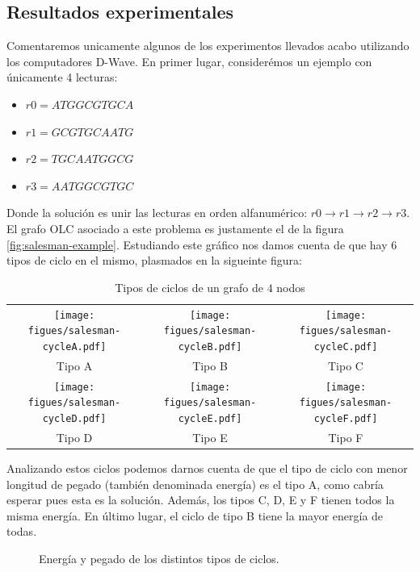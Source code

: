 \documentclass[11pt]{article}
\begin{document}
\subsection{Resultados experimentales}

Comentaremos unicamente algunos de los experimentos llevados acabo utilizando los computadores D-Wave. En primer lugar, considerémos un ejemplo con únicamente 4 lecturas:

\begin{itemize}
	\item $r0 = ATGGCGTGCA$
	\item $r1 = GCGTGCAATG$
	\item $r2 = TGCAATGGCG$
	\item $r3 = AATGGCGTGC$
\end{itemize}

Donde la solución es unir las lecturas en orden alfanumérico: $r0 \rightarrow r1 \rightarrow r2 \rightarrow r3$. El grafo OLC asociado a este problema es justamente el de la figura \ref{fig:salesman-example}. Estudiando este gráfico nos damos cuenta de que hay 6 tipos de ciclo en el mismo, plasmados en la sigueinte figura:

\begin{table}[H]
	\centering
	\begin{tabular}{ccc}		
		\texttt{[image: figues/salesman-cycleA.pdf]} &
		\texttt{[image: figues/salesman-cycleB.pdf]} &
		\texttt{[image: figues/salesman-cycleC.pdf]} \\
		
		Tipo A & Tipo B & Tipo C \\
		
		\texttt{[image: figues/salesman-cycleD.pdf]} &
		\texttt{[image: figues/salesman-cycleE.pdf]} &
		\texttt{[image: figues/salesman-cycleF.pdf]} \\
		
		Tipo D & Tipo E & Tipo F \\
	\end{tabular}
	\caption{Tipos de ciclos de un grafo de $4$ nodos}
	\label{tbl:salesman-cycles}
\end{table}

Analizando estos ciclos podemos darnos cuenta de que el tipo de ciclo con menor longitud de pegado (también denominada energía) es el tipo A, como cabría esperar pues esta es la solución. Además, los tipos C, D, E y F tienen todos la misma energía. En último lugar, el ciclo de tipo B tiene la mayor energía de todas.

\begin{figure}[H]
	\centering
	\caption{Energía y pegado de los distintos tipos de ciclos.}
\end{figure}
\end{document}
